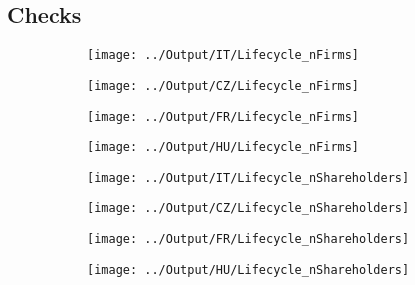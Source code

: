 \documentclass[12pt,notitlepage]{article}
\begin{document}
\subsection{Checks} %
\label{sec:checks}

\begin{figure}[!htpb]
\centering
\caption{Firms Distribution across age}
\begin{subfigure}{.49\textwidth}
    \centering
 \texttt{[image: ../Output/IT/Lifecycle\_nFirms]}
\end{subfigure}%
\begin{subfigure}{.49\textwidth}
    \centering
 \texttt{[image: ../Output/CZ/Lifecycle\_nFirms]}
\end{subfigure}
\begin{subfigure}{.49\textwidth}
    \centering
 \texttt{[image: ../Output/FR/Lifecycle\_nFirms]}
\end{subfigure}%
\begin{subfigure}{.49\textwidth}
    \centering
 \texttt{[image: ../Output/HU/Lifecycle\_nFirms]}
\end{subfigure}
\end{figure}
\pagebreak


\begin{figure}[!htpb]
\centering
\caption{Firm age and Number of Shareholders}
\begin{subfigure}{.49\textwidth}
    \centering
 \texttt{[image: ../Output/IT/Lifecycle\_nShareholders]}
\end{subfigure}%
\begin{subfigure}{.49\textwidth}
    \centering
 \texttt{[image: ../Output/CZ/Lifecycle\_nShareholders]}
\end{subfigure}
\begin{subfigure}{.49\textwidth}
    \centering
 \texttt{[image: ../Output/FR/Lifecycle\_nShareholders]}
\end{subfigure}%
\begin{subfigure}{.49\textwidth}
    \centering
 \texttt{[image: ../Output/HU/Lifecycle\_nShareholders]}
\end{subfigure}
\end{figure}
\pagebreak
\end{document}
